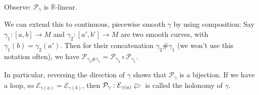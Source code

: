 \documentclass[10pt,letterpaper]{article}
\newcommand{\n}{\hfill\break}
\newcommand{\reals}{\mathbb{R}}
\newcommand{\R}{\reals}
\newcommand{\of}{\circ}
\begin{document}
\par\noindent
Observe: $\mathcal{P}_{\gamma}$ is $\R$-linear.\n

\par\noindent
We can extend this to continuous, piecewise smooth $\gamma$ by using composition: Say $\gamma_{1}:[a,b]\to{}M$ and $\gamma_{2}:[a',b']\to{}M$ are two smooth curves, with $\gamma_{1}(b)=\gamma_{2}(a')$. Then for their concatenation $\gamma_{2}\#\gamma_{1}$ (we won't use this notation often), we have $\mathcal{P}_{\gamma_{2}\#\gamma_{1}}=\mathcal{P}_{\gamma_{2}}\of\mathcal{P}_{\gamma_{1}}$.\n

\par\noindent
In particular, reversing the direction of $\gamma$ shows that $\mathcal{P}_{\gamma}$ is a bijection. If we have a loop, so $\mathcal{E}_{\gamma(a)}=\mathcal{E}_{\gamma(b)}$, then $\begin{tikzcd}[cramped]\mathcal{P}_{\gamma}:\mathcal{E}_{\gamma(a)} \arrow[loop, out=5, in=-5, looseness=7]\end{tikzcd}$ is called the holonomy of $\gamma$.
\end{document}
